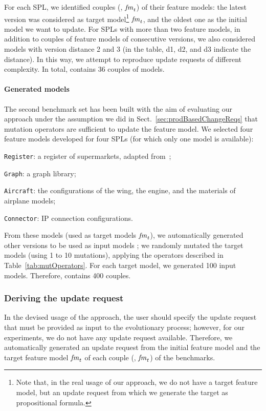 \begin{tikzborder}{\cite{Gargantini16:validation}}
\begin{tikzborder}{\cite{gargantini_combinatorial_2017}}
\begin{tikzborder}{\cite{gargantini_combinatorial_2017}}
\begin{tikzborder}{\cite{garn2019}}
\begin{tikzborder}{\cite{arcaini2019achieving}}
	For each SPL, we identified couples (\initFm, $\mathit{fm}_t$) of their feature models: the latest version was considered as target model\footnote{Note that, in the real usage of our approach, we do not have a target feature model, but an update request \UR from which we generate the target as propositional formula.} $\mathit{fm}_t$, and the oldest one as the initial model \initFm we want to update. For SPLs with more than two feature models, in addition to couples of feature models of consecutive versions, we also considered models with version distance 2 and 3 (in the table, d1, d2, and d3 indicate the distance). In this way, we attempt to reproduce update requests of different complexity. In total, \benchReal contains 36 couples of models.\be
	
	\paragraph{Generated models}
	\bb The second benchmark set \benchMut has been built with the aim of evaluating our approach under the assumption we did in Sect.~\ref{sec:prodBasedChangeReqs} that mutation operators are sufficient to update the feature model. We selected four feature models developed for four SPLs (for which only one model is available):
	\begin{compactitem}
		\item {\tt Register}: a register of supermarkets, adapted from~\cite{Shimbara2015};
		\item {\tt Graph}: a graph library;
		\item {\tt Aircraft}: the configurations of the wing, the engine, and the materials of airplane models;
		\item {\tt Connector}: IP connection configurations.
	\end{compactitem}
	From these models (used as target models $\mathit{fm}_t$), we automatically generated other versions to be used as input models \initFm; we randomly mutated the target models (using 1 to 10 mutations), applying the operators described in Table~\ref{tab:mutOperators}. For each target model, we generated 100 input models. Therefore, \benchMut contains 400 couples.\be
	
	\subsubsection{Deriving the update request}
	
	\bb In the devised usage of the approach, the user should specify the update request that must be provided as input to the evolutionary process; however, for our experiments, we do not have any update request available. Therefore, we automatically generated an update request \UR from the initial feature model \initFm and the target feature model $\mathit{fm}_t$ of each couple (\initFm, $\mathit{fm}_t$) of the benchmarks.
	

\end{tikzborder}
\end{tikzborder}
\end{tikzborder}
\end{tikzborder}
\end{tikzborder}
